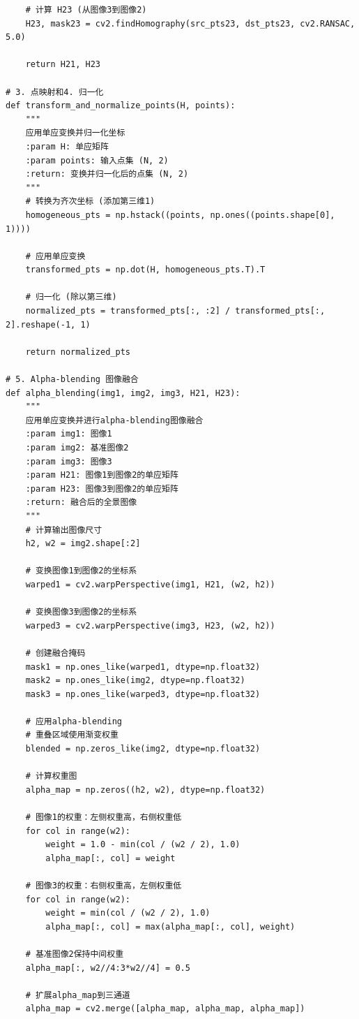 \documentclass{article}
\begin{document}
\begin{lstlisting}
    # 计算 H23 (从图像3到图像2)
    H23, mask23 = cv2.findHomography(src_pts23, dst_pts23, cv2.RANSAC, 5.0)
    
    return H21, H23

# 3. 点映射和4. 归一化
def transform_and_normalize_points(H, points):
    """
    应用单应变换并归一化坐标
    :param H: 单应矩阵
    :param points: 输入点集 (N, 2)
    :return: 变换并归一化后的点集 (N, 2)
    """
    # 转换为齐次坐标 (添加第三维1)
    homogeneous_pts = np.hstack((points, np.ones((points.shape[0], 1))))
    
    # 应用单应变换
    transformed_pts = np.dot(H, homogeneous_pts.T).T
    
    # 归一化 (除以第三维)
    normalized_pts = transformed_pts[:, :2] / transformed_pts[:, 2].reshape(-1, 1)
    
    return normalized_pts

# 5. Alpha-blending 图像融合
def alpha_blending(img1, img2, img3, H21, H23):
    """
    应用单应变换并进行alpha-blending图像融合
    :param img1: 图像1
    :param img2: 基准图像2
    :param img3: 图像3
    :param H21: 图像1到图像2的单应矩阵
    :param H23: 图像3到图像2的单应矩阵
    :return: 融合后的全景图像
    """
    # 计算输出图像尺寸
    h2, w2 = img2.shape[:2]
    
    # 变换图像1到图像2的坐标系
    warped1 = cv2.warpPerspective(img1, H21, (w2, h2))
    
    # 变换图像3到图像2的坐标系
    warped3 = cv2.warpPerspective(img3, H23, (w2, h2))
    
    # 创建融合掩码
    mask1 = np.ones_like(warped1, dtype=np.float32)
    mask2 = np.ones_like(img2, dtype=np.float32)
    mask3 = np.ones_like(warped3, dtype=np.float32)
    
    # 应用alpha-blending
    # 重叠区域使用渐变权重
    blended = np.zeros_like(img2, dtype=np.float32)
    
    # 计算权重图
    alpha_map = np.zeros((h2, w2), dtype=np.float32)
    
    # 图像1的权重：左侧权重高，右侧权重低
    for col in range(w2):
        weight = 1.0 - min(col / (w2 / 2), 1.0)
        alpha_map[:, col] = weight
    
    # 图像3的权重：右侧权重高，左侧权重低
    for col in range(w2):
        weight = min(col / (w2 / 2), 1.0)
        alpha_map[:, col] = max(alpha_map[:, col], weight)
    
    # 基准图像2保持中间权重
    alpha_map[:, w2//4:3*w2//4] = 0.5
    
    # 扩展alpha_map到三通道
    alpha_map = cv2.merge([alpha_map, alpha_map, alpha_map])
    

\end{lstlisting}
\end{document}
